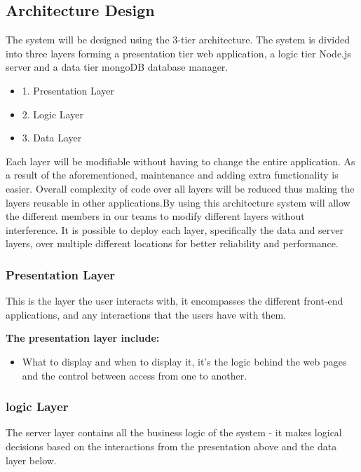 \documentclass[a4paper,12pt]{article}
\begin{document}
\subsection{Architecture Design}
\begin{paragraph}
        The system will be designed using the 3-tier architecture. The system is divided into three layers forming a presentation tier web application, a logic tier Node.js server and a data tier mongoDB database manager.
        \begin{itemize}
            \item 1. Presentation Layer
            \item 2. Logic Layer
            \item 3. Data Layer
        \end{itemize}
         Each layer will be modifiable without having to change the entire application. As a result of the aforementioned, maintenance and adding extra functionality is easier. Overall complexity of code over all layers will be reduced thus making the layers reusable in other applications.By using this architecture system will allow the different members in our teams to modify different layers without interference. It is possible to deploy each layer, specifically the data and server layers, over multiple different locations for better reliability and performance.
\end{paragraph}
 
  \subsubsection{Presentation Layer}
    \begin{paragraph}
       This is the layer the user interacts with, it encompasses the different front-end applications, and any interactions that the users have with them.     
    \end{paragraph}
    \textbf{The presentation layer include:  }
      \begin{itemize}
        \item What to display and when to display it, it’s the logic behind the web pages and the control between access from one to another.
      \end{itemize}
  
  \subsubsection{logic Layer}
    \begin{paragraph}
        The server layer contains all the business logic of the system - it makes logical decisions based on the interactions from the presentation above and the data layer below.   
    \end{paragraph}
\end{document}
